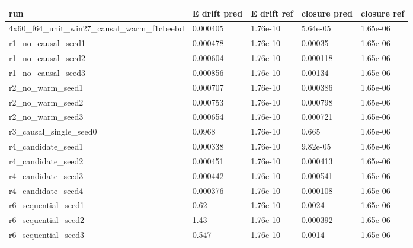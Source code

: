 \begin{table}[htbp]
\centering
\begin{tabular}{lllll}
\toprule
run & E drift pred & E drift ref & closure pred & closure ref \\
\midrule
4x60\_f64\_unit\_win27\_causal\_warm\_f1cbeebd & 0.000405 & 1.76e-10 & 5.64e-05 & 1.65e-06 \\
r1\_no\_causal\_seed1 & 0.000478 & 1.76e-10 & 0.00035 & 1.65e-06 \\
r1\_no\_causal\_seed2 & 0.000604 & 1.76e-10 & 0.000118 & 1.65e-06 \\
r1\_no\_causal\_seed3 & 0.000856 & 1.76e-10 & 0.00134 & 1.65e-06 \\
r2\_no\_warm\_seed1 & 0.000707 & 1.76e-10 & 0.000386 & 1.65e-06 \\
r2\_no\_warm\_seed2 & 0.000753 & 1.76e-10 & 0.000798 & 1.65e-06 \\
r2\_no\_warm\_seed3 & 0.000654 & 1.76e-10 & 0.000721 & 1.65e-06 \\
r3\_causal\_single\_seed0 & 0.0968 & 1.76e-10 & 0.665 & 1.65e-06 \\
r4\_candidate\_seed1 & 0.000338 & 1.76e-10 & 9.82e-05 & 1.65e-06 \\
r4\_candidate\_seed2 & 0.000451 & 1.76e-10 & 0.000413 & 1.65e-06 \\
r4\_candidate\_seed3 & 0.000442 & 1.76e-10 & 0.000541 & 1.65e-06 \\
r4\_candidate\_seed4 & 0.000376 & 1.76e-10 & 0.000108 & 1.65e-06 \\
r6\_sequential\_seed1 & 0.62 & 1.76e-10 & 0.0024 & 1.65e-06 \\
r6\_sequential\_seed2 & 1.43 & 1.76e-10 & 0.000392 & 1.65e-06 \\
r6\_sequential\_seed3 & 0.547 & 1.76e-10 & 0.0014 & 1.65e-06 \\
\bottomrule
\end{tabular}
\end{table}
